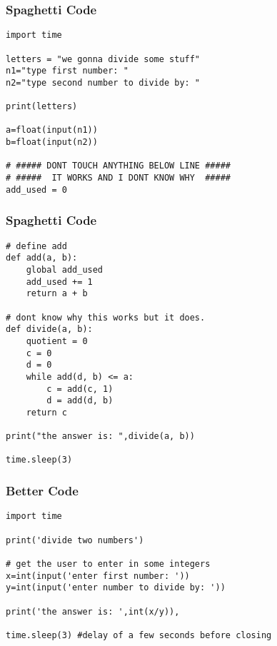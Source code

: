 \begin{frame}[fragile]
	\frametitle{Spaghetti Code}
		
	\begin{lstlisting}
import time

letters = "we gonna divide some stuff"
n1="type first number: "
n2="type second number to divide by: "

print(letters)

a=float(input(n1))
b=float(input(n2))

# ##### DONT TOUCH ANYTHING BELOW LINE #####
# #####  IT WORKS AND I DONT KNOW WHY  #####
add_used = 0
	\end{lstlisting}	
	
\end{frame}

\begin{frame}[fragile]
	\frametitle{Spaghetti Code}
		
	\begin{lstlisting}
# define add
def add(a, b):
    global add_used
    add_used += 1
    return a + b

# dont know why this works but it does.
def divide(a, b):
    quotient = 0
    c = 0
    d = 0
    while add(d, b) <= a:
        c = add(c, 1)
        d = add(d, b)
    return c

print("the answer is: ",divide(a, b))

time.sleep(3)
	\end{lstlisting}	


\end{frame}

\begin{frame}[fragile]
	\frametitle{Better Code}
		
	\begin{lstlisting}
import time

print('divide two numbers')

# get the user to enter in some integers
x=int(input('enter first number: '))
y=int(input('enter number to divide by: '))

print('the answer is: ',int(x/y)),

time.sleep(3) #delay of a few seconds before closing
	\end{lstlisting}	
	
\end{frame}


